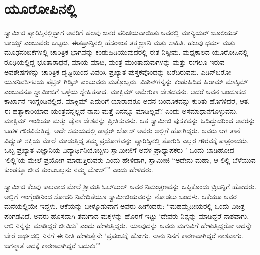 
\chapter{ಯೂರೋಪಿನಲ್ಲಿ}

 ಸ್ವಾಮೀಜಿ ಪ್ಯಾರಿಸ್ಸಿನಲ್ಲಿದ್ದಾಗ ಅವರಿಗೆ ಹಲವು ಜನರ ಪರಿಚಯವಾಯಿತು.\break ಅವರಲ್ಲಿ ಮಾನ್ಯಿಯರ್ ಜೂಲಿಯಸ್ ಬಾಯ್ಸ್ ಎಂಬುವರು ಒಬ್ಬರು. ಈತ\break ಫ್ರಾನ್ಸಿನಲ್ಲಿ ಹೆಸರಾಂತ ತತ್ತ್ವಜ್ಞಾನಿ ಮತ್ತು ಸಾಹಿತಿ. ಹಲವು ಧರ್ಮ ಮತ್ತು ಮೂಢನಂಬಿಕೆಗಳಲ್ಲಿ ಚಾರಿತ್ರಿಕ ಭಾಗವನ್ನು ಕಂಡುಹಿಡಿಯುವುದರಲ್ಲಿ ಈತ ನಿಸ್ಸೀಮ. ಮಧ್ಯಕಾಲದ ಯೂರೋಪಿನಲ್ಲಿ ರೂಢಿಯಲ್ಲಿದ್ದ ಭೂತಾರಾಧನೆ, ಮಾಯ ಮಾಟ, ಮಂತ್ರ ಮುಂತಾದುವುಗಳನ್ನು ಮತ್ತು ಈಗಲೂ ಇರುವ ಅವಶೇಷಗಳನ್ನು ಚಾರಿತ್ರಿಕ ದೃಷ್ಟಿಯಿಂದ ವಿವರಿಸಿ ಪ್ರಖ್ಯಾತ ಪುಸ್ತಕವೊಂದನ್ನು ಬರೆದಿರುವನು. ಎಡಿನ್‍ಬರೋ ಯೂನಿವರ್ಸಿಟಿಯ ಪೆಟ್ರಿಕ್ ಗಿಡ್ಸಿಸ್ ಎಂಬುವರು ಮತ್ತೊಬ್ಬರು. ಮಿಶಿನ್‍ಗನ್ನನ್ನು ಕಂಡುಹಿಡಿದ ಹಿರಾಮ್ ಮಾಕ್ಸಿಮ್ ಎಂಬುವನೂ ಸ್ವಾಮೀಜಿಗೆ ಒಳ್ಳೆಯ ಸ್ನೇಹಿತನಾದ. ಮಾಕ್ಸಿಮ್ ಅಮೇರಿಕಾ ದೇಶದವನು. ಆದರೆ ಅವನ ಬಂದೂಕದ ಕಾರ್ಖಾನೆ ಇಂಗ್ಲೆಂಡಿನಲ್ಲಿದೆ. ಮಾಕ್ಸಿಮ್ ಎದುರಿಗೆ ಯಾರಾದರೂ ಅವನ ಬಂದೂಕವನ್ನು ಕುರಿತು ಹೊಗಳಿದರೆ, ಆತ, ಈ ಹತ್ಯಾಕಾರಿಯಾದ ಯಂತ್ರವನ್ನಲ್ಲದೆ ನಾನು ಮತ್ತೆ ಏನನ್ನೂ ಮಾಡಿಲ್ಲವೆ? ಎಂದು ಅಸಮಾಧಾನಗೊಳ್ಳುವನು. ಮಾಕ್ಸಿಮ್ ಇಂಡಿಯಾ ಮತ್ತು ಚೈನಾ ದೇಶವನ್ನು ಪ್ರೀತಿಸುವನು. ಆತ ಸ್ವಾಮೀಜಿ ಪುಸ್ತಕವನ್ನು ಓದಿದ್ದುದರಿಂದ ಅವರನ್ನು ಬಹಳ ಗೌರವಿಸುತ್ತಿದ್ದ. ಅದೇ ಸಮಯದಲ್ಲಿ ಡಾಕ್ಟರ್ ಬೋಸ್ ಅವರು ಅಲ್ಲಿಗೆ ಹೋಗಿದ್ದರು. ಅವರು ಆಗ ತಾನೆ ವಿದ್ಯುತ್ ಶಕ್ತಿಯ ಮೇಲೆ ಮಾಡುತ್ತಿದ್ದ ತಮ್ಮ ಪ್ರಯೋಗವನ್ನು ಪ್ಯಾರಿಸ್ಸಿನಲ್ಲಿ ತೋರಿಸಿ ಎಲ್ಲರ ಗೌರವಕ್ಕೆ ಪಾತ್ರರಾದರು. ಒಬ್ಬ ಪ್ರಖ್ಯಾತ ವಿಜ್ಞಾನಿಯ ವಿದ್ಯಾರ್ಥಿನಿಯೊಬ್ಬಳು ಸ್ವಾಮೀಜಿಗೆ ಅವಳ ಪ್ರಾಧ್ಯಾಪಕರು ' ಒಂದು ಬಾಡಿಹೋದ ‘ಲಿಲ್ಲಿ’ಯ ಮೇಲೆ ಪ್ರಯೋಗ ಮಾಡುತ್ತಿರುವರು ಎಂದು ಹೇಳಿದಾಗ, ಸ್ವಾಮೀಜಿ “ಅದೇನು ಮಹಾ, ಆ ಲಿಲ್ಲಿ ಬೆಳೆಯುವ ಕುಂಡಕ್ಕೂ ಜೀವ ತುಂಬಬಲ್ಲನು ನಮ್ಮ ಬೋಸ್!” ಎಂದು ಹೇಳಿದರು.

 ಸ್ವಾಮೀಜಿ ಕೆಲವು ಕಾಲವಾದ ಮೇಲೆ ಶ‍್ರೀಮತಿ ಓಲ್‍ಬುಲ್ ಅವರ ನಿಮಂತ್ರಣವನ್ನು ಒಪ್ಪಿಕೊಂಡು ಬ್ರಿಟನ್ನಿಗೆ ಹೋದರು. ಅಲ್ಲಿಗೆ ಇಂಗ್ಲೆಂಡಿನಿಂದ ಸೋದರಿ ನಿವೇದಿತೆಯೂ ಸ್ವಾಮೀಜಿಯವರನ್ನು ನೋಡಲು ಬಂದಳು. ಆಕೆಯೂ ಅವರ ಮನೆಯಲ್ಲಿಯೇ ಇದ್ದಳು. ಆಕೆಯನ್ನು ಬೀಳ್ಕೊಡುವಾಗ ಅವರು ಹೀಗೆಂದರು: “ಮಹಮ್ಮದೀಯರಲ್ಲಿ ಒಂದು ವಿಚಿತ್ರ ಪಂಗಡವಿದೆ. ಅವರು ಹೊಸದಾಗಿ ತಮಗಾದ ಮಕ್ಕಳನ್ನು ಹೊರಗೆ ಇಟ್ಟು ‘ದೇವರು ನಿನ್ನನ್ನು ಮಾಡಿದ್ದರೆ ನಾಶವಾಗು, ಆಲಿ ನಿನ್ನನ್ನು ಮಾಡಿದ್ದರೆ ಜೀವಿಸು’ ಎಂದು ಹೇಳುತ್ತಿದ್ದರು. ಯಾವುದನ್ನು ಅವರು ಮಗುವಿಗೆ ಹೇಳುತ್ತಿದ್ದರೋ ಅದನ್ನೇ ಬೇರೆ ಅರ್ಥದಲ್ಲಿ ನಿನಗೆ ಈ ರೀತಿ ಹೇಳುತ್ತೇನೆ: ‘ಪ್ರಪಂಚಕ್ಕೆ ಹೋಗು. ನಾನು ನಿನಗೆ ಕಾರಣವಾಗಿದ್ದರೆ ನಾಶವಾಗು. ಜಗನ್ಮಾತೆ ಅದಕ್ಕೆ ಕಾರಣವಾಗಿದ್ದರೆ ಬದುಕು’.” 

